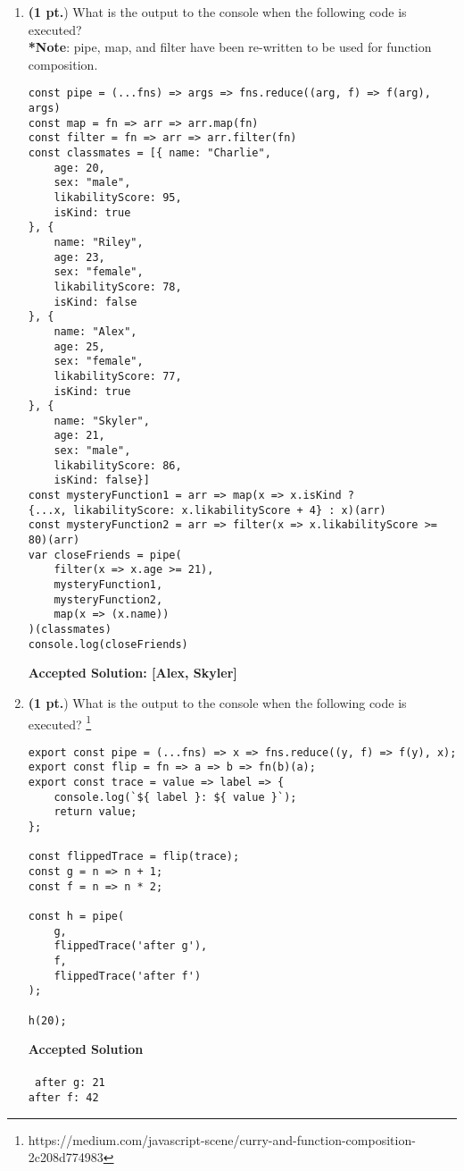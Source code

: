 \documentclass[12pt]{article}
\begin{document}
\begin{enumerate}
\item \textbf{(1 pt.}) What is the output to the console when the following code is executed? \\ \textbf{*Note}: pipe, map, and filter have been re-written to be used for function composition.
\begin{lstlisting}[style=JavaScript]
const pipe = (...fns) => args => fns.reduce((arg, f) => f(arg), args)
const map = fn => arr => arr.map(fn)
const filter = fn => arr => arr.filter(fn)
const classmates = [{ name: "Charlie",
    age: 20,
    sex: "male",
    likabilityScore: 95,
    isKind: true
}, {
    name: "Riley",
    age: 23,
    sex: "female",
    likabilityScore: 78,
    isKind: false
}, {
    name: "Alex",
    age: 25,
    sex: "female",
    likabilityScore: 77,
    isKind: true
}, {
    name: "Skyler",
    age: 21,
    sex: "male",
    likabilityScore: 86,
    isKind: false}]
const mysteryFunction1 = arr => map(x => x.isKind ? 
{...x, likabilityScore: x.likabilityScore + 4} : x)(arr)
const mysteryFunction2 = arr => filter(x => x.likabilityScore >= 80)(arr)
var closeFriends = pipe(
    filter(x => x.age >= 21),
    mysteryFunction1,
    mysteryFunction2,
    map(x => (x.name))
)(classmates)
console.log(closeFriends)
\end{lstlisting}
\textbf{Accepted Solution: [\textquotesingle Alex\textquotesingle, \textquotesingle Skyler\textquotesingle  ]}


\newpage
\item \textbf{(1 pt.}) What is the output to the console when the following code is executed? \footnote{\label{note2}https://medium.com/javascript-scene/curry-and-function-composition-2c208d774983}
\begin{lstlisting}[style=JavaScript]
export const pipe = (...fns) => x => fns.reduce((y, f) => f(y), x);
export const flip = fn => a => b => fn(b)(a);
export const trace = value => label => {
    console.log(`${ label }: ${ value }`);
    return value;
};

const flippedTrace = flip(trace);
const g = n => n + 1;
const f = n => n * 2;

const h = pipe(
    g,                
    flippedTrace('after g'),
    f,
    flippedTrace('after f')
);

h(20);
\end{lstlisting} 

\noindent \textbf{Accepted Solution} \\ \\
\texttt{
after g: 21 \\
after f: 42
}


\end{enumerate}
\end{document}
